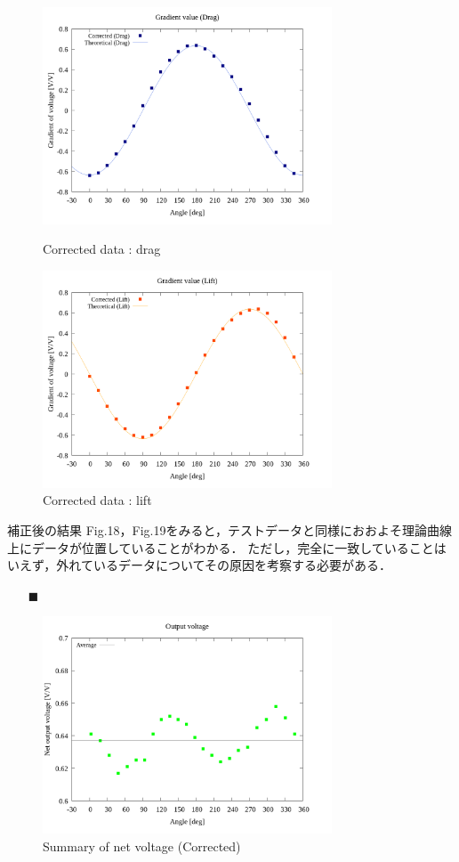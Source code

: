 \documentclass[twocolumn,a4j]{jsarticle}
\begin{document}
\begin{figure}[htbp]
    \footnotesize
    \begin{center}
        \includegraphics[width=86mm]{../graphes/1-ex/21/21-2_corrected_drag.png}
        \caption{Corrected data : drag}
        \includegraphics[width=86mm]{../graphes/1-ex/21/21-2_corrected_lift.png}
        \caption{Corrected data : lift}
    \end{center}
\end{figure}

補正後の結果 Fig.18，Fig.19をみると，テストデータと同様におおよそ理論曲線上にデータが位置していることがわかる．
ただし，完全に一致していることはいえず，外れているデータについてその原因を考察する必要がある．

\newpage

\begin{itemize}
    \item [$\blacksquare$] 
\end{itemize}

\begin{figure}[htbp]
    \footnotesize
    \begin{center}
        \includegraphics[width=86mm]{../graphes/1-ex/09/09_summary-outputvoltage-net.png}
        \caption{Summary of net voltage (Corrected)}
    \end{center}
\end{figure}
\end{document}
